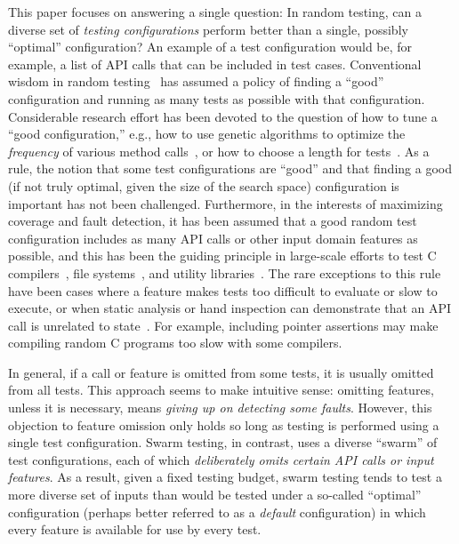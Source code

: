

This paper focuses on answering a single question: In random testing,
can a diverse set of \emph{testing configurations} perform better than
a single, possibly ``optimal'' configuration? 
%
An example of a test configuration would be, for example, a list of
API calls that can be included in test cases.
%
Conventional wisdom in random testing~\cite{Hamlet94} has assumed a
policy of finding a ``good'' configuration and running as many tests
as possible with that configuration.
%
Considerable research effort has been devoted to the question of how
to tune a ``good configuration,'' e.g., how to use genetic algorithms
to optimize the \emph{frequency} of various method
calls~\cite{AndrewsL07}, or how to choose a length for
tests~\cite{ASE08}.
%
As a rule, the notion that some test configurations are ``good'' and
that finding a good (if not truly optimal, given the size of the
search space) configuration is important has not been challenged.
Furthermore, in the interests of maximizing coverage and fault
detection, it has been assumed that a good random test configuration
includes as many API calls or other input domain features as possible,
and this has been the guiding principle in large-scale efforts to test
C compilers~\cite{csmith}, file systems~\cite{ICSEDiff}, and utility
libraries~\cite{Pacheco}.  The rare exceptions to this rule have been
cases where a feature makes tests too difficult to evaluate or slow to
execute, or when static analysis or hand inspection can demonstrate
that an API call is unrelated to state~\cite{ICSEDiff}.  For example,
including pointer assertions may make compiling random C programs too
slow with some compilers.

In general, if a call or feature is omitted from some tests, it is
usually omitted from all tests.  This approach seems to make intuitive
sense: omitting features, unless it is necessary, means \emph{giving
up on detecting some faults}.  However, this objection to feature
omission only holds so long as testing is performed using a single
test configuration.  Swarm testing, in contrast, uses a diverse
``swarm'' of test configurations, each of which \emph{deliberately
omits certain API calls or input features}.
%
As a result, given a fixed testing budget, swarm testing tends to test
a more diverse set of inputs than would be tested under a so-called
``optimal'' configuration (perhaps better referred to as a
\emph{default} configuration) in which every feature is available for
use by every test.

